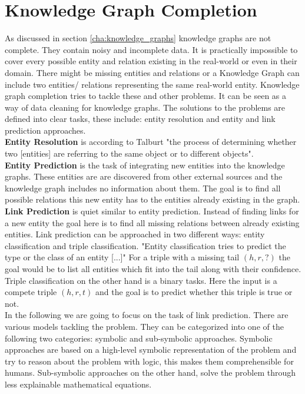 \chapter{Knowledge Graph Completion}
\label{cha:knowledge_graph_completion}

As discussed in section \ref{cha:knowledge_graphs} knowledge graphs are not complete. They contain noisy  and incomplete data. It is practically impossible to cover every possible entity and relation existing in the real-world or even in their domain. There might be missing entities and relations or a Knowledge Graph can include two entities/ relations representing the same real-world entity. Knowledge graph completion tries to tackle these and other problems. It can be seen as a way of data cleaning for knowledge graphs. The solutions to the problems are defined into clear tasks, these include: entity resolution and entity and link prediction approaches. \\

\textbf{Entity Resolution} is according to Talburt "the process of determining whether two [entities] are referring to the same object or to different objects". \cite{talburt_entity_2011} \\ 

\textbf{Entity Prediction} is the task of integrating new entities into the knowledge graphs. These entities are are discovered from other external sources and the knowledge graph includes no information about them. The goal is to find all possible relations this new entity has to the entities already existing in the graph. \cite[p.~1]{baumgartner_entity_2021} \\

\textbf{Link Prediction} is quiet similar to entity prediction. Instead of finding links for a new entity the goal here is to find all missing relations between already existing entities. \cite[p.~125]{golbeck_analyzing_2013} Link prediction can be approached in two different ways: entity classification and triple classification. "Entity classification tries to predict the type or the class of an entity [...]" \cite{ilkou_symbolic_2020} For a triple with a missing tail $(h,r,?)$ the goal would be to list all entities which fit into the tail along with their confidence. Triple classification on the other hand is a binary tasks. Here the input is a compete triple $(h,r,t)$ and the goal is to predict whether this triple is true or not. \cite{ilkou_symbolic_2020} \\

In the following we are going to focus on the task of link prediction. There are various models tackling the problem. They can be categorized into one of the following two categories: symbolic and sub-symbolic approaches. Symbolic approaches are based on a high-level symbolic representation of the problem and try to reason about the problem with logic, this makes them comprehensible for humans. Sub-symbolic approaches on the other hand, solve the problem through less explainable mathematical equations. \cite{ilkou_symbolic_2020}

